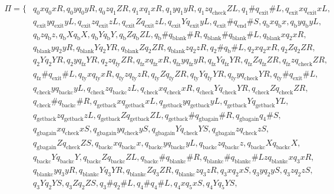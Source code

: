 \documentclass[a4paper,12pt, centered]{article}
\begin{document}
\begin{enumerate}
			\begin{align*}
				\Pi=\{&q_0xq_0xR, q_0yq_0yR, q_0zq_1ZR, q_1xq_1xR, q_1yq_1yR, q_1zq_{\textrm{check}}ZL, q_1\#q_{\textrm{exit}}\#L, q_{\textrm{exit}}xq_{\textrm{exit}}xL,\\& q_{\textrm{exit}}yq_{\textrm{exit}}yL, q_{\textrm{exit}}zq_{\textrm{exit}}zL,q_{\textrm{exit}}Zq_{\textrm{exit}}zL, q_{\textrm{exit}}Yq_{\textrm{exit}}yL, q_{\textrm{exit}}\#q_{\textrm{end}}\#S, q_{\textrm{b}}xq_{\textrm{b}}x, q_{\textrm{b}}yq_{\textrm{b}}yL,\\& q_{\textrm{b}}zq_{\textrm{b}}z, q_{\textrm{b}}Xq_{\textrm{b}}X, q_{\textrm{b}}Yq_{\textrm{b}}Y, q_{\textrm{b}}Zq_{\textrm{b}}ZL, q_{\textrm{b}}\#q_{\textrm{blank}}\#R, q_{\textrm{blank}}\#q_{\textrm{blank}}\#L, q_{\textrm{blank}}xq_2xR,\\& q_{\textrm{blank}}yq_2yR, q_{\textrm{blank}}Yq_2YR, q_{\textrm{blank}}Zq_2ZR, q_{\textrm{blank}}zq_2zR, q_2\#q_{\textrm{b}}\#L, q_2xq_2xR, q_2Zq_2ZR,\\& q_2Yq_2YR, q_2yq_{\textrm{fz}}YR, q_2zq_{\textrm{fy}}ZR, q_{\textrm{fz}}xq_{\textrm{fz}}xR, q_{\textrm{fz}}yq_{\textrm{fz}}yR, q_{\textrm{fz}}Yq_{\textrm{fz}}YR, q_{\textrm{fz}}Zq_{\textrm{fz}}ZR, q_{\textrm{fz}}zq_{\textrm{check}}ZR,\\& q_{\textrm{fz}}\#q_{\textrm{exit}}\#L, q_{\textrm{fy}}xq_{\textrm{fy}}xR, q_{\textrm{fy}}zq_{\textrm{fy}}zR, q_{\textrm{fy}}Zq_{\textrm{fy}}ZR, q_{\textrm{fy}}Yq_{\textrm{fy}}YR, q_{\textrm{fy}}yq_{\textrm{check}}YR, q_{\textrm{fy}}\#q_{\textrm{exit}}\#L,\\& q_{\textrm{check}}yq_{\textrm{backc}}yL, q_{\textrm{check}}zq_{\textrm{backc}}zL, q_{\textrm{check}}xq_{\textrm{check}}xR, q_{\textrm{check}}Yq_{\textrm{check}}YR, q_{\textrm{check}}Zq_{\textrm{check}}ZR,\\& q_{\textrm{check}}\#q_{\textrm{backc}}\#R, q_{\textrm{getback}}xq_{\textrm{getback}}xL, q_{\textrm{getback}}yq_{\textrm{getback}}yL, q_{\textrm{getback}}Yq_{\textrm{getback}}YL,\\& q_{\textrm{getback}}zq_{\textrm{getback}}zL, q_{\textrm{getback}}Zq_{\textrm{getback}}ZL, q_{\textrm{getback}}\#q_{\textrm{gbagain}}\#R, q_{\textrm{gbagain}}q_4\#S,\\& q_{\textrm{gbagain}}xq_{\textrm{check}}xS, q_{\textrm{gbagain}}yq_{\textrm{check}}yS, q_{\textrm{gbagain}}Yq_{\textrm{check}}YS, q_{\textrm{gbagain}}zq_{\textrm{check}}zS, \\&q_{\textrm{gbagain}}Zq_{\textrm{check}}ZS, q_{\textrm{backc}}xq_{\textrm{backc}}x, q_{\textrm{backc}}yq_{\textrm{backc}}yL, q_{\textrm{backc}}zq_{\textrm{backc}}z, q_{\textrm{backc}}Xq_{\textrm{backc}}X, \\&q_{\textrm{backc}}Yq_{\textrm{backc}}Y, q_{\textrm{backc}}Zq_{\textrm{backc}}ZL, q_{\textrm{backc}}\#q_{\textrm{blankc}}\#R, q_{\textrm{blankc}}\#q_{\textrm{blankc}}\#Lz q_{\textrm{blankc}}xq_3xR, \\&q_{\textrm{blankc}}yq_3yR, q_{\textrm{blankc}}Yq_3YR, q_{\textrm{blankc}}Zq_3ZR, q_{\textrm{blankc}}zq_3zR, q_3xq_2xS, q_3yq_2yS, q_3zq_2zS,\\& q_3Yq_2YS, q_3Zq_2ZS, q_3\#q_2\#L, q_4\#q_4\#L, q_4xq_5xS, q_4Yq_5YS, 
\end{align*}
\end{enumerate}
\end{document}
